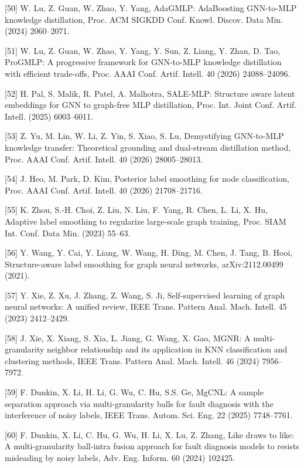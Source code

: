 {[}50{]} W. Lu, Z. Guan, W. Zhao, Y. Yang, AdaGMLP: AdaBoosting GNN-to-MLP knowledge distillation, Proc. ACM SIGKDD Conf. Knowl. Discov. Data Min. (2024) 2060--2071.

{[}51{]} W. Lu, Z. Guan, W. Zhao, Y. Yang, Y. Sun, Z. Liang, Y. Zhan, D. Tao, ProGMLP: A progressive framework for GNN-to-MLP knowledge distillation with efficient trade-offs, Proc. AAAI Conf. Artif. Intell. 40 (2026) 24088--24096.

{[}52{]} H. Pal, S. Malik, R. Patel, A. Malhotra, SALE-MLP: Structure aware latent embeddings for GNN to graph-free MLP distillation, Proc. Int. Joint Conf. Artif. Intell. (2025) 6003--6011.

{[}53{]} Z. Yu, M. Lin, W. Li, Z. Yin, S. Xiao, S. Lu, Demystifying GNN-to-MLP knowledge transfer: Theoretical grounding and dual-stream distillation method, Proc. AAAI Conf. Artif. Intell. 40 (2026) 28005--28013.

{[}54{]} J. Heo, M. Park, D. Kim, Posterior label smoothing for node classification, Proc. AAAI Conf. Artif. Intell. 40 (2026) 21708--21716.

{[}55{]} K. Zhou, S.-H. Choi, Z. Liu, N. Liu, F. Yang, R. Chen, L. Li, X. Hu, Adaptive label smoothing to regularize large-scale graph training, Proc. SIAM Int. Conf. Data Min. (2023) 55--63.

{[}56{]} Y. Wang, Y. Cai, Y. Liang, W. Wang, H. Ding, M. Chen, J. Tang, B. Hooi, Structure-aware label smoothing for graph neural networks, arXiv:2112.00499 (2021).

{[}57{]} Y. Xie, Z. Xu, J. Zhang, Z. Wang, S. Ji, Self-supervised learning of graph neural networks: A unified review, IEEE Trans. Pattern Anal. Mach. Intell. 45 (2023) 2412--2429.

{[}58{]} J. Xie, X. Xiang, S. Xia, L. Jiang, G. Wang, X. Gao, MGNR: A multi-granularity neighbor relationship and its application in KNN classification and clustering methods, IEEE Trans. Pattern Anal. Mach. Intell. 46 (2024) 7956--7972.

{[}59{]} F. Dunkin, X. Li, H. Li, G. Wu, C. Hu, S.S. Ge, MgCNL: A sample separation approach via multi-granularity balls for fault diagnosis with the interference of noisy labels, IEEE Trans. Autom. Sci. Eng. 22 (2025) 7748--7761.

{[}60{]} F. Dunkin, X. Li, C. Hu, G. Wu, H. Li, X. Lu, Z. Zhang, Like draws to like: A multi-granularity ball-intra fusion approach for fault diagnosis models to resists misleading by noisy labels, Adv. Eng. Inform. 60 (2024) 102425.

